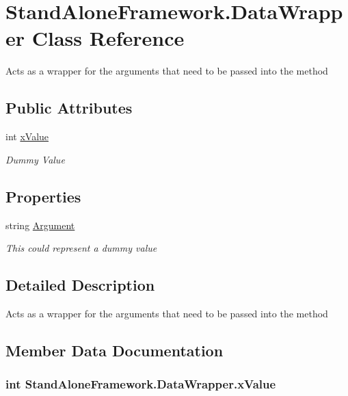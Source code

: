 \hypertarget{class_stand_alone_framework_1_1_data_wrapper}{\section{Stand\+Alone\+Framework.\+Data\+Wrapper Class Reference}
\label{class_stand_alone_framework_1_1_data_wrapper}
}


Acts as a wrapper for the arguments that need to be passed into the method  


\subsection*{Public Attributes}
\begin{DoxyCompactItemize}
\item 
int \hyperlink{class_stand_alone_framework_1_1_data_wrapper_a35e406cf3d38047236b60b94618e2181}{x\+Value}
\begin{DoxyCompactList}\small\item\em Dummy Value \end{DoxyCompactList}\end{DoxyCompactItemize}
\subsection*{Properties}
\begin{DoxyCompactItemize}
\item 
string \hyperlink{class_stand_alone_framework_1_1_data_wrapper_a37c856045eb222ea573dee4a2e64e34d}{Argument}
\begin{DoxyCompactList}\small\item\em This could represent a dummy value \end{DoxyCompactList}\end{DoxyCompactItemize}


\subsection{Detailed Description}
Acts as a wrapper for the arguments that need to be passed into the method 



\subsection{Member Data Documentation}
\hypertarget{class_stand_alone_framework_1_1_data_wrapper_a35e406cf3d38047236b60b94618e2181}{
\subsubsection[{x\+Value}]{\setlength{\rightskip}{0pt plus 5cm}int Stand\+Alone\+Framework.\+Data\+Wrapper.\+x\+Value}}\label{class_stand_alone_framework_1_1_data_wrapper_a35e406cf3d38047236b60b94618e2181}


